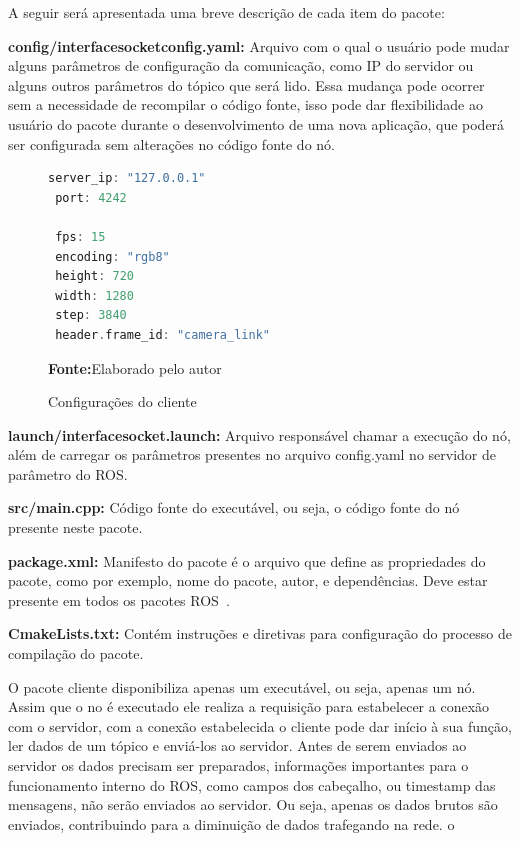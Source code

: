 A seguir será apresentada uma breve descrição de cada item do pacote:
 
\textbf{config/interface\underline{\hspace{.07in}}socket\underline{\hspace{.07in}}config.yaml:} Arquivo com o qual o usuário pode mudar alguns parâmetros de configuração da comunicação, como IP do servidor ou alguns outros parâmetros do tópico que será lido. Essa mudança pode ocorrer sem a necessidade de recompilar o código fonte, isso pode dar flexibilidade ao usuário do pacote durante o desenvolvimento de uma nova aplicação, que poderá ser configurada sem alterações no código fonte do nó. 

\begin{figure}[ht]
\caption{Configurações do cliente}
\begin{center}
\begin{lstlisting}[language=C++, backgroundcolor=\color{gray!10}]
 server_ip: "127.0.0.1"
 port: 4242

 fps: 15
 encoding: "rgb8"
 height: 720
 width: 1280
 step: 3840
 header.frame_id: "camera_link"
\end{lstlisting}
{\small \textbf{Fonte:}Elaborado pelo autor}	
\end{center}\label{fig:codigoconfig}
\end{figure}
	

\textbf{launch/interface\underline{\hspace{.07in}}socket.launch:} Arquivo responsável chamar a execução do nó, além de carregar os parâmetros presentes no arquivo config.yaml no servidor de parâmetro do ROS\@.

\textbf{src/main.cpp:} Código fonte do executável, ou seja, o código fonte do nó presente neste pacote.

\textbf{package.xml:} Manifesto do pacote é o arquivo que define as propriedades do pacote, como por exemplo, nome do pacote, autor, e dependências. Deve estar presente em todos os pacotes ROS~\cite{RosPkgXml}.


\textbf{CmakeLists.txt:} Contém instruções e diretivas para configuração do processo de compilação do pacote.

O pacote cliente disponibiliza apenas um executável, ou seja, apenas um nó. Assim que o no é executado ele realiza a requisição para estabelecer a conexão com o servidor, com a conexão estabelecida o cliente pode dar início à sua função, ler dados de um tópico e enviá-los ao servidor. Antes de serem enviados ao servidor os dados precisam ser preparados, informações importantes para o funcionamento interno do ROS, como campos dos cabeçalho, ou timestamp das mensagens, não serão enviados ao servidor. Ou seja, apenas os dados brutos são enviados, contribuindo para a diminuição de dados trafegando na rede. o

